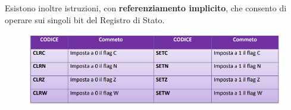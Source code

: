 \documentclass[12pt]{article} %
\begin{document}
\newpage \noindent Esistono inoltre istruzioni, con \textbf{referenziamento implicito}, che consento di operare sui singoli bit del Registro di Stato.
\begin{figure}[h]
    \centering
    \includegraphics[width=1\linewidth]{Operare sui registri di stato.png}
\end{figure}
\par\maketitle\noindent 
\end{document}
